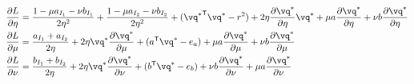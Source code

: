 \begin{equation}
\begin{split} 
\frac{\partial L}{\partial \eta} &= \frac{1-\mu a_{I_1} - \nu b_{I_1}}{2\eta^2} +  \frac{1-\mu a_{I_2} - \nu b_ {I_2}}{2\eta^2} + ( {\vq^{*}}^{\tranT}\vq^{*} -r^2) + 2\eta\frac{\partial \vq^{*}}{\partial \eta}\vq^{*} +\mu a \frac{\partial \vq^{*}}{\partial \eta} + \nu b \frac{\partial \vq^{*}}{\partial \eta}\\
\frac{\partial L}{\partial \mu} &= \frac{a_{I_1} + a_{I_2}}{2\eta} + 2 \eta \vq^{*}\frac{\partial \vq^{*}}{\partial \mu} +( a^{\tranT}\vq^{*} - e_a ) + \mu a \frac{\partial \vq^{*}}{\partial \mu} + \nu b \frac{\partial \vq^{*}}{\partial \mu} \\
\frac{\partial L}{\partial \nu} &= \frac{b_{I_1} + b_{I_2}}{2\eta} + 2 \eta \vq^{*}\frac{\partial \vq^{*}}{\partial \nu} +( b^{\tranT}\vq^{*} - e_b ) + \nu b \frac{\partial \vq^{*}}{\partial \nu} + \mu a \frac{\partial \vq^{*}}{\partial \nu} 
 \end{split}
\end{equation}